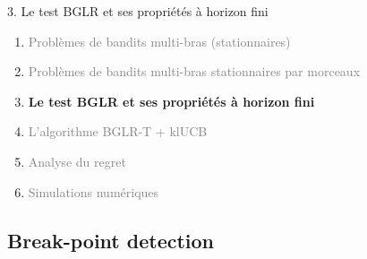 \documentclass[11pt,french,ignorenonframetext,]{beamer}
\begin{document}
\begin{frame}{3. Le test BGLR et ses propriétés à horizon fini}

  \begin{enumerate}
    \item
    \textcolor{gray}{
      Problèmes de bandits multi-bras (stationnaires)
    }
    \vspace*{15pt}

    \item
    \textcolor{gray}{
      Problèmes de bandits multi-bras stationnaires par morceaux
    }
    \vspace*{15pt}

    \item
    \alert{\textbf{%
      Le test BGLR et ses propriétés à horizon fini
    }}
    \vspace*{15pt}

    \item
    \textcolor{gray}{
      L'algorithme BGLR-T + klUCB
    }
    \vspace*{15pt}

    \item
    \textcolor{gray}{
      Analyse du regret
    }
    \vspace*{15pt}

    \item
    \textcolor{gray}{
      Simulations numériques
    }
  \end{enumerate}

\end{frame}


\subsection{\hfill{}Break-point detection\hfill{}}
\end{document}
